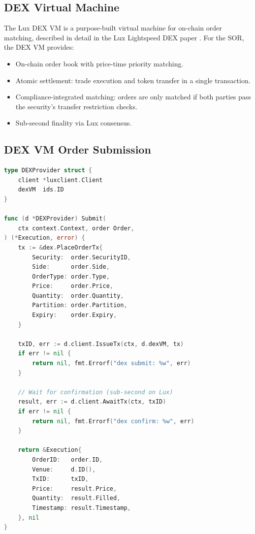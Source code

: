 \documentclass[11pt,a4paper]{article}
\begin{document}
\subsection{DEX Virtual Machine}

The Lux DEX VM is a purpose-built virtual machine for on-chain order matching, described in detail in the Lux Lightspeed DEX paper \cite{lux-lightspeed-dex}. For the SOR, the DEX VM provides:

\begin{itemize}[nosep]
  \item On-chain order book with price-time priority matching.
  \item Atomic settlement: trade execution and token transfer in a single transaction.
  \item Compliance-integrated matching: orders are only matched if both parties pass the security's transfer restriction checks.
  \item Sub-second finality via Lux consensus.
\end{itemize}

\subsection{DEX VM Order Submission}

\begin{lstlisting}[language=Go,caption={DEX VM order submission via SOR.}]
type DEXProvider struct {
    client *luxclient.Client
    dexVM  ids.ID
}

func (d *DEXProvider) Submit(
    ctx context.Context, order Order,
) (*Execution, error) {
    tx := &dex.PlaceOrderTx{
        Security:  order.SecurityID,
        Side:      order.Side,
        OrderType: order.Type,
        Price:     order.Price,
        Quantity:  order.Quantity,
        Partition: order.Partition,
        Expiry:    order.Expiry,
    }

    txID, err := d.client.IssueTx(ctx, d.dexVM, tx)
    if err != nil {
        return nil, fmt.Errorf("dex submit: %w", err)
    }

    // Wait for confirmation (sub-second on Lux)
    result, err := d.client.AwaitTx(ctx, txID)
    if err != nil {
        return nil, fmt.Errorf("dex confirm: %w", err)
    }

    return &Execution{
        OrderID:   order.ID,
        Venue:     d.ID(),
        TxID:      txID,
        Price:     result.Price,
        Quantity:  result.Filled,
        Timestamp: result.Timestamp,
    }, nil
}
\end{lstlisting}
\end{document}
